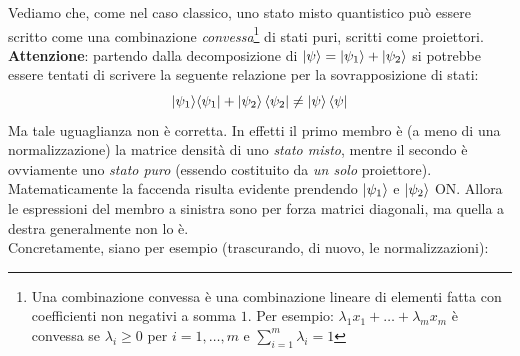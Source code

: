 \documentclass[../../FisicaTeorica.tex]{subfiles}
\begin{document}
Vediamo che, come nel caso classico, uno stato misto quantistico può essere scritto come una combinazione \textit{convessa}\footnote{Una combinazione convessa è una combinazione lineare di elementi fatta con coefficienti non negativi a somma $1$. Per esempio: $\lambda_1 x_1 + \dots +\lambda_m x_m$ è convessa se $\lambda_i \geq 0$ per $i=1,\dots,m$ e $\sum_{i=1}^m \lambda_i = 1$} di stati puri, scritti come proiettori.\\
\textbf{Attenzione}: partendo dalla decomposizione di $\ket{\psi} = \ket{\psi_1}+\ket{\psi_2}$ si potrebbe essere tentati di scrivere la seguente relazione per la sovrapposizione di stati:
\[
|\psi_1\rangle \langle \psi_1|+\left|\psi_2\right\rangle\left\langle\psi_2\right|\neq \ket{\psi}\bra{\psi}
\]
Ma tale uguaglianza non è corretta. In effetti il primo membro è (a meno di una normalizzazione) la matrice densità di uno \textit{stato misto}, mentre il secondo è ovviamente uno \textit{stato puro} (essendo costituito da \textit{un solo} proiettore).\\
Matematicamente la faccenda risulta evidente prendendo $\ket{\psi_1}$ e $\ket{\psi_2}$ ON. Allora le espressioni del membro a sinistra sono per forza matrici diagonali, ma quella a destra generalmente non lo è.\\
Concretamente, siano per esempio (trascurando, di nuovo, le normalizzazioni):
\end{document}
